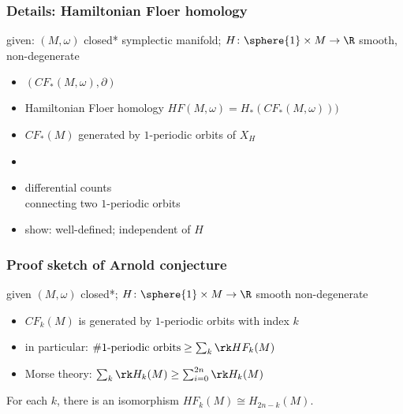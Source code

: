 \begin{frame}
  \frametitle{Details: Hamiltonian Floer homology}
  given: $(M,\omega)$ closed* symplectic manifold; $H\colon \sphere{1}\times M\to \R$ smooth, non-degenerate%
  \begin{itemize}
    \item {} $(CF_*(M,\omega),\partial)$
    \item Hamiltonian Floer homology $HF(M,\omega)=H_*(CF_*(M,\omega)))$
    \item $CF_*(M)$ generated by $1$-periodic orbits of $X_H$
    \item {}
    \item differential counts  \\connecting two $1$-periodic orbits
    \item show: well-defined; independent of $H$
  \end{itemize}
\end{frame}

\begin{frame}
  \frametitle{Proof sketch of Arnold conjecture}
  given $(M,\omega)$ closed*; $H\colon \sphere{1}\times M\to \R$ smooth non-degenerate
  \begin{itemize}
    \item $CF_k(M)$ is generated by $1$-periodic orbits with index $k$
    \item in particular: $\# 1\text{-periodic orbits} \geq \sum_k \rk HF_k(M)$
    \item Morse theory: $\sum_k \rk H_k(M)\geq \sum_{i=0}^{2n} \rk H_k(M)$
  \end{itemize}
  \begin{theorem}
    For each $k$, there is an isomorphism $HF_k(M)\cong H_{2n-k}(M)$.
  \end{theorem}
\end{frame}
